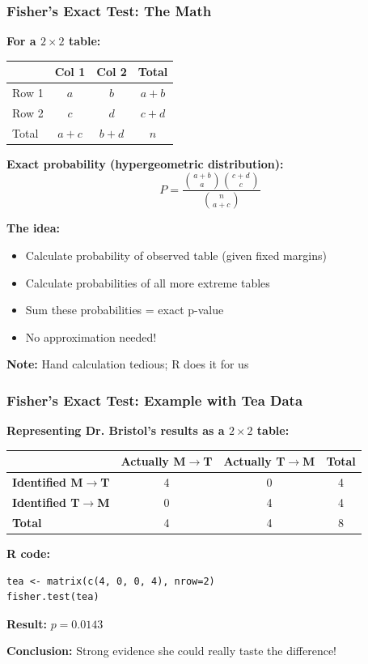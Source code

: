 \documentclass{beamer}
\begin{document}
\begin{frame}
\frametitle{Fisher's Exact Test: The Math}
\textbf{For a $2 \times 2$ table:}
\begin{center}
\begin{tabular}{l|cc|c}
& Col 1 & Col 2 & Total \\
\hline
Row 1 & $a$ & $b$ & $a+b$ \\
Row 2 & $c$ & $d$ & $c+d$ \\
\hline
Total & $a+c$ & $b+d$ & $n$ \\
\end{tabular}
\end{center}

\vspace{0.2cm}
\textbf{Exact probability (hypergeometric distribution):}
$$P = \frac{\binom{a+b}{a} \binom{c+d}{c}}{\binom{n}{a+c}}$$

\vspace{0.2cm}
\textbf{The idea:}
\begin{itemize}
\item Calculate probability of observed table (given fixed margins)
\item Calculate probabilities of all more extreme tables
\item Sum these probabilities = exact p-value
\item No approximation needed!
\end{itemize}

\vspace{0.1cm}
\textbf{Note:} Hand calculation tedious; R does it for us
\end{frame}

\begin{frame}[fragile]
\frametitle{Fisher's Exact Test: Example with Tea Data}
\textbf{Representing Dr. Bristol's results as a $2 \times 2$ table:}

\vspace{0.2cm}
\begin{center}
\begin{tabular}{l|cc|c}
& \textbf{Actually M$\rightarrow$T} & \textbf{Actually T$\rightarrow$M} & \textbf{Total} \\
\hline
\textbf{Identified M$\rightarrow$T} & 4 & 0 & 4 \\
\textbf{Identified T$\rightarrow$M} & 0 & 4 & 4 \\
\hline
\textbf{Total} & 4 & 4 & 8 \\
\end{tabular}
\end{center}

\vspace{0.3cm}
\textbf{R code:}
\begin{verbatim}
tea <- matrix(c(4, 0, 0, 4), nrow=2)
fisher.test(tea)
\end{verbatim}

\vspace{0.2cm}
\textbf{Result:} $p = 0.0143$

\vspace{0.2cm}
\textbf{Conclusion:} Strong evidence she could really taste the difference!
\end{frame}
\end{document}
